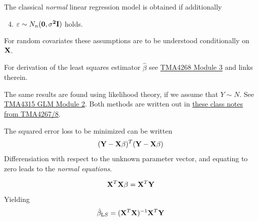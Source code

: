 \documentclass[
  ignorenonframetext,
]{beamer}
\providecommand{\tightlist}{%
  \setlength{\itemsep}{0pt}\setlength{\parskip}{0pt}}
\begin{document}
\begin{frame}

The classical \emph{normal} linear regression model is obtained if
additionally

\begin{enumerate}
\setcounter{enumi}{3}
\tightlist
\item
  \(\varepsilon\sim N_n(\bf{0},\sigma^2\bf{I})\) holds.
\end{enumerate}

For random covariates these assumptions are to be understood
conditionally on \(\bf{X}\).

For derivation of the least squares estimator \(\hat{\beta}\) see
\href{https://www.math.ntnu.no/emner/TMA4268/2019v/3LinReg/3LinReg.html\#parameter_estimation}{TMA4268
Module 3} and links therein.

The same results are found using likelihood theory, if we assume that
\(Y\sim N\). See
\href{https://www.math.ntnu.no/emner/TMA4315/2018h/2MLR.html\#likelihood_theory_(from_b4)}{TMA4315
GLM Module 2}. Both methods are written out in
\href{https://www.math.ntnu.no/emner/TMA4268/2018v/notes/LeastSquaresMLR.pdf}{these
class notes from TMA4267/8}.

\end{frame}

\begin{frame}

The squared error loss to be minimized can be written
\[({\bf Y}-{\bf X}{{\beta}})^T({\bf Y}-{\bf X}{{\beta}})\]
Differensiation with respect to the unknown parameter vector, and
equating to zero leads to the \emph{normal equations}.

\[ {\bf X}^T{\bf X}{\beta}= {\bf X}^T {\bf Y}\] Yielding
\[ \hat{\beta}_{\text LS}=({\bf X}^T{\bf X})^{-1} {\bf X}^T {\bf Y}\]

\end{frame}
\end{document}
